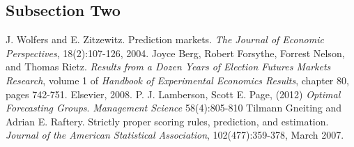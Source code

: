 \documentclass[twoside,twocolumn]{article}
\begin{document}
\subsection{Subsection Two}

\blindtext %


\begin{thebibliography}{99} %

J. Wolfers and E. Zitzewitz. Prediction markets. \textit{The Journal of Economic Perspectives},
18(2):107-126, 2004.
 Joyce Berg, Robert Forsythe, Forrest Nelson, and Thomas Rietz. \textit{Results from
a Dozen Years of Election Futures Markets Research}, volume 1 of \textit{Handbook of
Experimental Economics Results}, chapter 80, pages 742-751. Elsevier, 2008.
P. J. Lamberson, Scott E. Page, (2012) \textit{Optimal Forecasting Groups}. \textit{Management Science} 58(4):805-810
Tilmann Gneiting and Adrian E. Raftery. Strictly proper scoring rules, prediction,
and estimation. \textit{Journal of the American Statistical Association}, 102(477):359-378,
March 2007.

 
\end{thebibliography}

\end{document}
